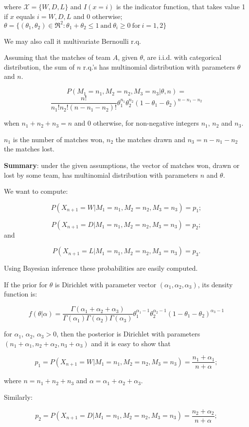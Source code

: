 \documentclass[journal,article,accept,moreauthors,pdftex,12pt,a4paper]{mdpi}
\begin{document}
\noindent
where $\mathcal{X}=\{W,D,L\}$ and $I(x=i)$ is the indicator function, that takes value 1 if $x$ equals $i= W, D, L$ and 0 otherwise; $\theta=\{(\theta_1,\theta_2)\in\Re^2:\theta_1+\theta_2\leq1 ~ \text{and} ~ \theta_i\geq0 ~ \text{for} ~ i=1, 2\}$

We may also call it multivariate Bernoulli r.q.

Assuming that the matches of team $A$, given $\theta$, are i.i.d. with categorical distribution, the sum of $n$ r.q.'s has multinomial distribution with parameters $\theta$ and $n$.

\[
P(M_1=n_1,M_2=n_2,M_3=n_3|\theta,n)=\]
\[
\frac{n!}{n_1!n_2!(n-n_1-n_2)!}\theta_1^{n_1}\theta_2^{n_2}(1-\theta_1-\theta_2)^{n-n_1-n_2}
\]

when $n_1+n_2+n_3=n$ and 0 otherwise, for non-negative integers $n_1$, $n_2$ and $n_3$.

$n_1$ is the number of matches won, $n_2$ the matches drawn and $n_3=n-n_1-n_2$ the matches lost.

{\bf Summary}: under the given assumptions, the vector of matches won, drawn or lost by some team, has multinomial distribution with parameters $n$ and $\theta$.

We want to compute: 

\[P(X_{n+1}=W|M_1=n_1,M_2=n_2,M_3=n_3)=p_1;\]

\[P(X_{n+1}=D|M_1=n_1,M_2=n_2,M_3=n_3)=p_2;\] and

\[P(X_{n+1}=L|M_1=n_1,M_2=n_2,M_3=n_3)=p_3.\]


Using Bayesian inference these probabilities are easily computed. 


If the prior for $\theta$ is Dirichlet with parameter vector $(\alpha_1,\alpha_2,\alpha_3)$, its density function is:

\[
f(\theta|\alpha)=\frac{\Gamma(\alpha_1+\alpha_2+\alpha_3)}{\Gamma(\alpha_1)\Gamma(\alpha_2)\Gamma(\alpha_3)}\theta_1^{\alpha_1-1}\theta_2^{\alpha_2-1}(1-\theta_1-\theta_2)^{\alpha_3-1}
\]

\noindent
for $\alpha_1$, $\alpha_2$, $\alpha_3 > 0$, then the posterior is Dirichlet with parameters $(n_1+\alpha_1,n_2+\alpha_2,n_3+\alpha_3)$ and it is easy to show that

\[p_1=P(X_{n+1}=W|M_1=n_1,M_2=n_2,M_3=n_3)=\frac{n_1+\alpha_1}{n+\alpha};\]

\noindent
where $n=n_1+n_2+n_3$ and $\alpha=\alpha_1+\alpha_2+\alpha_3$.

Similarly:

\[p_2=P(X_{n+1}=D|M_1=n_1,M_2=n_2,M_3=n_3)=\frac{n_2+\alpha_2}{n+\alpha};\]
\end{document}
